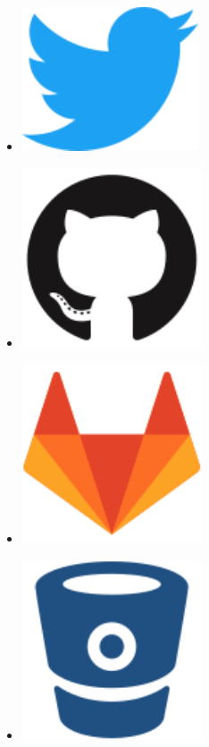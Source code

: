 \documentclass[a4paper,oneside,10pt]{article}
\begin{document}
\begin{multicols}{10}
\begin{itemize}
\item[]\href{https://twitter.com/metimdjai}{\includegraphics[scale=0.2]{assets/twitter-original.pdf}}

\item[]\href{https://github.com/iosang}{\includegraphics[scale=0.2]{assets/github-original.pdf}}

\item[]\href{https://gitlab.com/metimdjai}{\includegraphics[scale=0.2]{assets/gitlab-original.pdf}}

\item[]\href{https://bitbucket.org/Metimdjai/}{\includegraphics[scale=0.2]{assets/bitbucket-original.pdf}}


\end{itemize}
\end{multicols}
\end{document}
